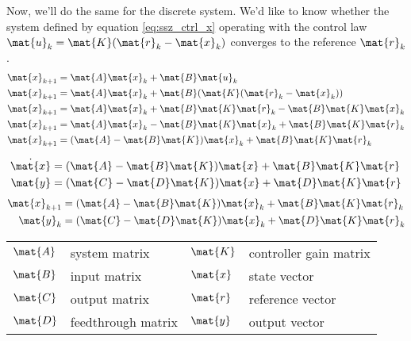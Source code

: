 Now, we'll do the same for the discrete \gls{system}. We'd like to know whether
the \gls{system} defined by equation \eqref{eq:ssz_ctrl_x} operating with the
\gls{control law} $\mat{u}_k = \mat{K}(\mat{r}_k - \mat{x}_k)$ converges to the
\gls{reference} $\mat{r}_k$.
\begin{align*}
  \mat{x}_{k+1} &= \mat{A}\mat{x}_k + \mat{B}\mat{u}_k \\
  \mat{x}_{k+1} &= \mat{A}\mat{x}_k + \mat{B}(\mat{K}(\mat{r}_k - \mat{x}_k)) \\
  \mat{x}_{k+1} &= \mat{A}\mat{x}_k + \mat{B}\mat{K}\mat{r}_k -
    \mat{B}\mat{K}\mat{x}_k \\
  \mat{x}_{k+1} &= \mat{A}\mat{x}_k - \mat{B}\mat{K}\mat{x}_k +
    \mat{B}\mat{K}\mat{r}_k \\
  \mat{x}_{k+1} &= (\mat{A} - \mat{B}\mat{K})\mat{x}_k + \mat{B}\mat{K}\mat{r}_k
\end{align*}
\begin{theorem}
  \begin{align}
    \dot{\mat{x}} &= (\mat{A} - \mat{B}\mat{K})\mat{x} + \mat{B}\mat{K}\mat{r}
      \label{eq:s_ref_ctrl_x} \\
    \mat{y} &= (\mat{C} - \mat{D}\mat{K})\mat{x} + \mat{D}\mat{K}\mat{r}
  \end{align}
  \begin{align}
    \mat{x}_{k+1} &= (\mat{A} - \mat{B}\mat{K})\mat{x}_k +
      \mat{B}\mat{K}\mat{r}_k \label{eq:z_ref_ctrl_x} \\
    \mat{y}_k &= (\mat{C} - \mat{D}\mat{K})\mat{x}_k + \mat{D}\mat{K}\mat{r}_k
  \end{align}
  \begin{figurekey}
    \begin{tabular}{llll}
      $\mat{A}$ & system matrix      & $\mat{K}$ & controller gain matrix \\
      $\mat{B}$ & input matrix       & $\mat{x}$ & state vector \\
      $\mat{C}$ & output matrix      & $\mat{r}$ & \gls{reference} vector \\
      $\mat{D}$ & feedthrough matrix & $\mat{y}$ & output vector \\
    \end{tabular}
  \end{figurekey}
\end{theorem}
